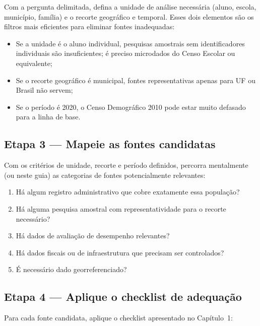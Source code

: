 Com a pergunta delimitada, defina a unidade de análise necessária (aluno, escola, município, família) e o recorte geográfico e temporal. Esses dois elementos são os filtros mais eficientes para eliminar fontes inadequadas:

\begin{itemize}
  \item Se a unidade é o aluno individual, pesquisas amostrais sem identificadores individuais são insuficientes; é preciso microdados do Censo Escolar ou equivalente;
  \item Se o recorte geográfico é municipal, fontes representativas apenas para UF ou Brasil não servem;
  \item Se o período é 2020, o Censo Demográfico 2010 pode estar muito defasado para a linha de base.
\end{itemize}

\subsection{Etapa 3 --- Mapeie as fontes candidatas}

Com os critérios de unidade, recorte e período definidos, percorra mentalmente (ou neste guia) as categorias de fontes potencialmente relevantes:

\begin{enumerate}
  \item Há algum registro administrativo que cobre exatamente essa população?
  \item Há alguma pesquisa amostral com representatividade para o recorte necessário?
  \item Há dados de avaliação de desempenho relevantes?
  \item Há dados fiscais ou de infraestrutura que precisam ser controlados?
  \item É necessário dado georreferenciado?
\end{enumerate}

\subsection{Etapa 4 --- Aplique o checklist de adequação}

Para cada fonte candidata, aplique o checklist apresentado no Capítulo~1:

